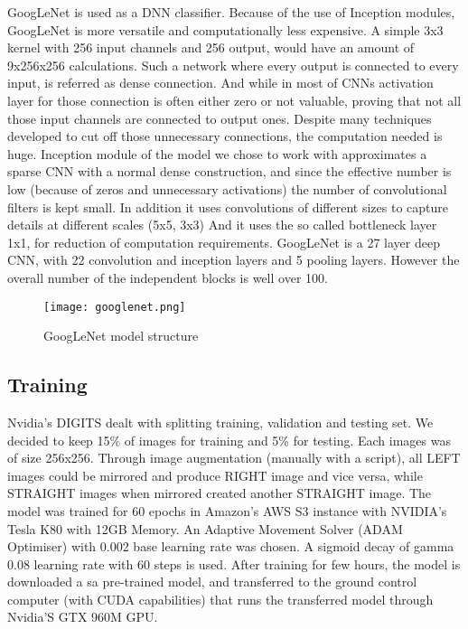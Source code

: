 \documentclass[conference]{IEEEtran}
\begin{document}
GoogLeNet is used as a DNN classifier. Because of the use of Inception modules, GoogLeNet is more versatile and computationally less expensive. A simple 3x3 kernel with 256 input channels and 256 output, would have an amount of 9x256x256 calculations. Such a network where every output is connected to every input, is referred as dense connection. And while in most of CNNs activation layer for those connection is often either zero or not valuable, proving that not all those input channels are connected to output ones. Despite many techniques developed to cut off those unnecessary connections, the computation needed is huge. Inception module of the model we chose to work with approximates a sparse CNN with a normal dense construction, and since the effective number is low (because of zeros and unnecessary activations) the number of convolutional filters is kept small. In addition it uses convolutions of different sizes to capture details at different scales (5x5, 3x3) And it uses the so called bottleneck layer 1x1, for reduction of computation requirements.
GoogLeNet is a 27 layer deep CNN, with 22 convolution and inception layers and 5 pooling layers. However the overall number of the independent blocks is well over 100.

\begin{figure}[thpb]
    \centering
      \texttt{[image: googlenet.png]}
      \caption{GoogLeNet model structure}
      \label{fig:robot1}
\end{figure}

\subsection{Training}
Nvidia's DIGITS dealt with splitting training, validation and testing set. We decided to keep 15\% of images for training and 5\% for testing. Each images was of size 256x256. Through image augmentation (manually with a script), all LEFT images could be mirrored and produce RIGHT image and vice versa, while STRAIGHT images when mirrored created another STRAIGHT image. The model was trained for 60 epochs in Amazon's AWS S3 instance with NVIDIA's Tesla K80 with 12GB Memory. An Adaptive Movement Solver (ADAM Optimiser) with 0.002 base learning rate was chosen. A sigmoid decay of gamma 0.08 learning rate with 60 steps is used. After training for few hours, the model is downloaded a sa pre-trained model, and transferred to the ground control computer (with CUDA capabilities) that runs the transferred model through Nvidia'S GTX 960M GPU.
\end{document}
